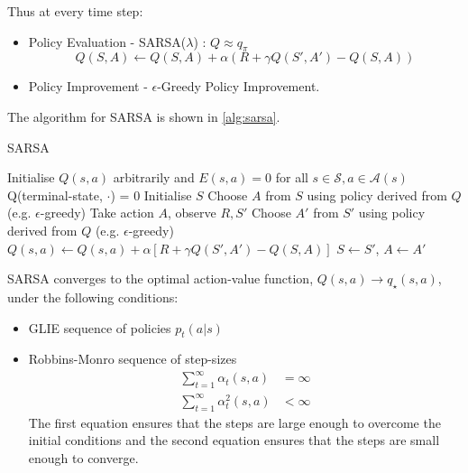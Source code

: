 Thus at every time step:
\begin{itemize}
  \item Policy Evaluation - SARSA(\(\lambda\)) : \(Q \approx q_\pi \)
  \[
    Q(S,A) \leftarrow Q(S,A) + \alpha \left( 
      R + \gamma Q(S', A') - Q(S,A)
     \right) 
  \]
  \item Policy Improvement - \(\epsilon\)-Greedy Policy Improvement.
\end{itemize}
The algorithm for SARSA is shown in \autoref{alg:sarsa}.
\begin{algorithm}[H]
  \caption{SARSA}
  \label{alg:sarsa}
  \begin{algorithmic}[1]
    \State Initialise \(Q(s,a)\) arbitrarily and \(E(s,a) = 0\) for all \(s \in \mathcal{S},
    a \in \mathcal{A}(s)\)
    \State Q(terminal-state, \(\cdot\)) = 0
      \State Initialise \(S\)
      \State Choose \(A\) from \(S\) using policy derived from \(Q\) (e.g.
      \(\epsilon\)-greedy)
        \State Take action \(A\), observe \(R, S'\)
        \State Choose \(A'\) from \(S'\) using policy derived from \(Q\) (e.g.
        \(\epsilon\)-greedy)
        \State \(Q(s,a) \leftarrow Q(s,a) + \alpha \left[ 
          R + \gamma Q(S', A') - Q(S,A)
         \right] \)
        \State \(S \leftarrow S'\), \(A \leftarrow A'\)
      \EndFor
    \EndFor
  \end{algorithmic}
\end{algorithm}

\begin{theorem}
  SARSA converges to the optimal action-value function, \(Q(s,a) \to q_\star(s,a)\), under
  the following conditions:
  \begin{itemize}
    \item GLIE sequence of policies \(p_t(a|s)\) 
    \item Robbins-Monro sequence of step-sizes
    \[
      \begin{aligned}
        \sum_{t=1}^{\infty} \alpha_t(s,a) &= \infty \\
        \sum_{t=1}^{\infty} \alpha_t^2(s,a) &< \infty
      \end{aligned}
    \]
    The first equation ensures that the steps are large enough to overcome the initial
    conditions and the second equation ensures that the steps are small enough to converge.

  \end{itemize}
\end{theorem}

